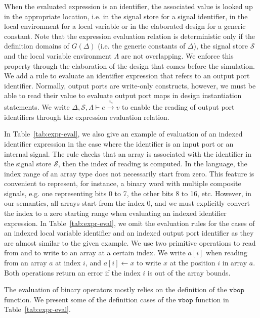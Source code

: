 \documentclass[pdflatex,sn-mathphys]{sn-jnl}%
\theoremstyle{thmstyleone}%
\theoremstyle{thmstyletwo}%
\theoremstyle{thmstylethree}%
\begin{document}
When the evaluated expression is an identifier, the associated value
is looked up in the appropriate location, i.e. in the signal store for
a signal identifier, in the local environment for a local variable or
in the elaborated design for a generic constant. Note that the
expression evaluation relation is deterministic only if the definition
domains of $G(\Delta)$ (i.e. the generic constants of $\Delta$), the
signal store $\mathcal{S}$ and the local variable environment
$\Lambda$ are not overlapping. We enforce this property through the
elaboration of the design that comes before the simulation. We add a
rule to evaluate an identifier expression that refers to an output
port identifier. Normally, output ports are write-only constructs,
however, we must be able to read their value to evaluate output port
maps in design instantiation statements. We write
$\Delta,\mathcal{S},\Lambda\vdash{}e\xrightarrow{e_o}v$ to enable the
reading of output port identifiers through the expression evaluation
relation.

In Table~\ref{tab:expr-eval}, we also give an example of evaluation of
an indexed identifier expression in the case where the identifier is
an input port or an internal signal. The rule checks that an array is
associated with the identifier in the signal store $\mathcal{S}$, then
the index of reading is computed. In the \hvhdl{} language, the index
range of an array type does not necessarily start from zero. This
feature is convenient to represent, for instance, a binary word with
multiple composite signals, e.g. one representing bits 0 to 7, the
other bits 8 to 16, etc. However, in our semantics, all arrays start
from the index 0, and we must explicitly convert the index to a zero
starting range when evaluating an indexed identifier expression. In
Table~\ref{tab:expr-eval}, we omit the evaluation rules for the cases
of an indexed local variable identifier and an indexed output port
identifier as they are almost similar to the given example. We use two
primitive operations to read from and to write to an array at a
certain index. We write $a[i]$ when reading from an array $a$ at index
$i$, and $a[i]\leftarrow{}x$ to write $x$ at the position $i$ in array
$a$. Both operations return an error if the index $i$ is out of the
array bounds.

The evaluation of binary operators mostly relies on the definition of
the $\mathtt{vbop}$ function. We present some of the definition cases
of the $\mathtt{vbop}$ function in Table~\ref{tab:expr-eval}.
\end{document}
